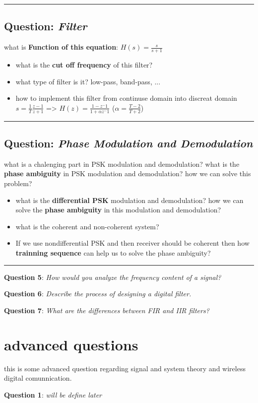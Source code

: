 \documentclass{article} %
\newcommand{\question}[2][]{\begin{flushleft}
    \textbf{Question #1}: \textit{#2}
\end{flushleft}}
\begin{document}
\hrule
\bigskip
\subsection{Question: \textit{Filter}}
    what is \textbf{Function of this equation}: $H(s) = \frac{s}{s+1}$
    \begin{itemize}
        \item what is the \textbf{cut off frequency} of this filter?
        \item what type of filter is it? low-pass, band-pass, ...
        \item how to implement this filter from continuse domain into discreat domain $s = \frac{1}{T} \frac{z-1}{z+1}$ =>    $H(z) = \frac{1-z^-1}{1+\alpha z^-1}$ ($\alpha = \frac{T-2}{T+2}$)
     \end{itemize}

    \hrule
    \bigskip
\subsection{Question: \textit{Phase Modulation and Demodulation}}
    what is a chalenging part in PSK modulation and demodulation? what is the \textbf{phase ambiguity} in PSK modulation and demodulation? how we can solve this problem?
    \begin{itemize}
        \item what is the \textbf{differential PSK} modulation and demodulation? how we can solve the \textbf{phase ambiguity} in this modulation and demodulation?
        \item what is the coherent and non-coherent system?
        \item If we use nondifferential PSK and then receiver should be coherent then how \textbf{trainning sequence} can help us to solve the phase ambiguity?
    \end{itemize}

    \hrule
    \bigskip
    \question[5]{How would you analyze the frequency content of a signal?}

    \question[6]{Describe the process of designing a digital filter.}

    \question[7]{What are the differences between FIR and IIR filters?}


\section{advanced questions}
    this is some advanced question regarding signal and system theory and wireless digital comunnication.
    
    \question[1]{will be define later} 
    
\end{document}
